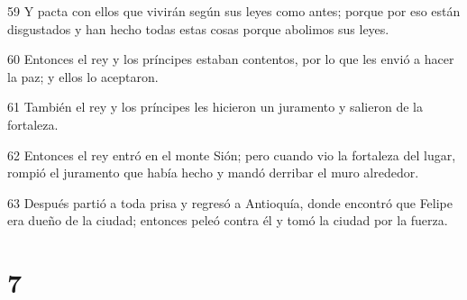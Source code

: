\par 59 Y pacta con ellos que vivirán según sus leyes como antes; porque por eso están disgustados y han hecho todas estas cosas porque abolimos sus leyes.
\par 60 Entonces el rey y los príncipes estaban contentos, por lo que les envió a hacer la paz; y ellos lo aceptaron.
\par 61 También el rey y los príncipes les hicieron un juramento y salieron de la fortaleza.
\par 62 Entonces el rey entró en el monte Sión; pero cuando vio la fortaleza del lugar, rompió el juramento que había hecho y mandó derribar el muro alrededor.
\par 63 Después partió a toda prisa y regresó a Antioquía, donde encontró que Felipe era dueño de la ciudad; entonces peleó contra él y tomó la ciudad por la fuerza.

\chapter{7}

